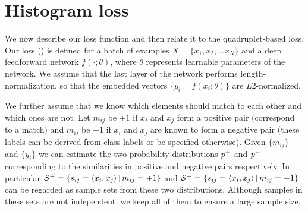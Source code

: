 \section{Histogram loss}
\label{sect:loss}

We now describe our loss function and then relate it to the quadruplet-based loss. Our loss () is defined for a batch of examples $X = \{x_1,x_2,\dots x_N\}$ and a deep feedforward network $f(\cdot;\theta)$, where $\theta$ represents learnable parameters of the network. We assume that the last layer of the network performs length-normalization, so that the embedded vectors $\{y_i = f(x_i;\theta)\}$ are $L2$-normalized.

We further assume that we know which elements should match to each other and which ones are not. Let $m_{ij}$ be $+1$ if $x_i$ and $x_j$ form a positive pair (correspond to a match) and $m_{ij}$ be $-1$ if $x_i$ and $x_j$ are known to form a negative pair  (these labels can be derived from class labels or be specified otherwise). Given $\{m_{ij}\}$ and $\{y_i\}$ we can estimate the two probability distributions $p^{+}$ and $p^{-}$ corresponding to the similarities in positive and negative pairs respectively. In particular ${\mathcal S}^{+} = \{ s_{ij} = {\langle{}x_i,x_j\rangle}\,|\,m_{ij} = +1\}$ and ${\mathcal S}^{-} = \{s_{ij} = {\langle{}x_i,x_j\rangle}\,|\,m_{ij} = -1\}$ can be regarded as sample sets from these two distributions. Although samples in these sets are not independent, we keep all of them to ensure a large sample size. 

